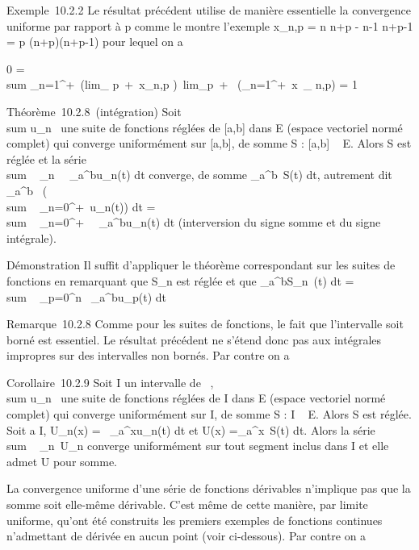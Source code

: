 \documentclass[]{article}
\begin{document}
Exemple~10.2.2 Le résultat précédent utilise de manière essentielle la
convergence uniforme par rapport à p comme le montre l'exemple
x\_n,p = n \over n+p - n-1
\over n+p-1 = p \over (n+p)(n+p-1)
pour lequel on a

0 = \\sum
\_n=1^+\infty~\left (lim\_
p\rightarrow~+\infty~x\_n,p\right
)\neq~lim\_p\rightarrow~+\infty~\left
(\sum \_n=1^+\infty~x~\_
n,p\right ) = 1

Théorème~10.2.8~(intégration) Soit
\\sum  u\_n~ une
suite de fonctions réglées de {[}a,b{]} dans E (espace vectoriel normé
complet) qui converge uniformément sur {[}a,b{]}, de somme S : {[}a,b{]}
\rightarrow~ E. Alors S est réglée et la série
\\sum ~
\_n\in{}~\int ~
\_a^bu\_n(t) dt converge, de somme
\int  \_a^b~S(t) dt, autrement dit
\int  \_a^b~\left
(\\sum ~
\_n=0^+\infty~u\_n(t)\right ) dt
= \\sum ~
\_n=0^+\infty~\int ~
\_a^bu\_n(t) dt (interversion du signe somme et du
signe intégrale).

Démonstration Il suffit d'appliquer le théorème correspondant sur les
suites de fonctions en remarquant que S\_n est réglée et que
\int  \_a^bS\_n~(t) dt
= \\sum ~
\_p=0^n\int ~
\_a^bu\_p(t) dt

Remarque~10.2.8 Comme pour les suites de fonctions, le fait que
l'intervalle soit borné est essentiel. Le résultat précédent ne s'étend
donc pas aux intégrales impropres sur des intervalles non bornés. Par
contre on a

Corollaire~10.2.9 Soit I un intervalle de ~,
\\sum  u\_n~ une
suite de fonctions réglées de I dans E (espace vectoriel normé complet)
qui converge uniformément sur I, de somme S : I \rightarrow~ E. Alors S est réglée.
Soit a \in I, U\_n(x) =\int ~
\_a^xu\_n(t) dt et U(x)
=\int  \_a^x~S(t) dt. Alors la
série \\sum ~
\_n\in{}~U\_n converge uniformément sur tout segment inclus
dans I et elle admet U pour somme.

La convergence uniforme d'une série de fonctions dérivables n'implique
pas que la somme soit elle-même dérivable. C'est même de cette manière,
par limite uniforme, qu'ont été construits les premiers exemples de
fonctions continues n'admettant de dérivée en aucun point (voir
ci-dessous). Par contre on a
\end{document}
